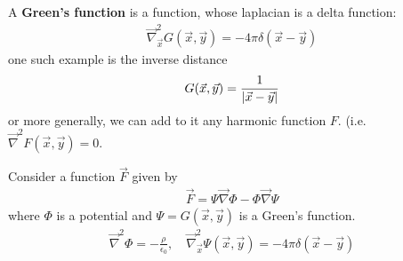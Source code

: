 A \textbf{Green's function} is a function, whose laplacian is a delta function:
\begin{align*}
  \vec{\nabla}_{\vec{x}}^{2} G(\vec{x},\vec{y}) = - 4 \pi \delta(\vec{x} - \vec{y})
\end{align*}
one such example is the inverse distance
\begin{align*}
  G(\vec{x},\vec{y}) = \frac{1}{\vert\vec{x} - \vec{y}\vert}
\end{align*}
or more generally, we can add to it any harmonic function $F$. (i.e. $\vec{\nabla}^{2} F(\vec{x},\vec{y}) = 0$.

Consider a function $\vec{F}$ given by
\begin{align*}
  \vec{F} = \Psi \vec{\nabla} \Phi - \Phi \vec{\nabla} \Psi
\end{align*}
where $\Phi$ is a potential and $\Psi = G(\vec{x},\vec{y})$ is a Green's function.
\begin{align*}
  \vec{\nabla}^{2} \Phi = - \frac{\rho}{\epsilon_0}, \quad \vec{\nabla}_{\vec{x}}^{2} \Psi(\vec{x},\vec{y}) = - 4 \pi \delta(\vec{x} - \vec{y})
\end{align*}

